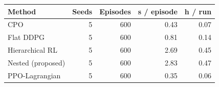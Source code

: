 \begin{tabular}{@{}lrrrr@{}}
\toprule
Method & Seeds & Episodes & s / episode & h / run \\
\midrule
CPO & 5 & 600 & 0.43 & 0.07 \\
Flat DDPG & 5 & 600 & 0.81 & 0.14 \\
Hierarchical RL & 5 & 600 & 2.69 & 0.45 \\
Nested (proposed) & 5 & 600 & 2.83 & 0.47 \\
PPO-Lagrangian & 5 & 600 & 0.35 & 0.06 \\
\bottomrule
\end{tabular}
